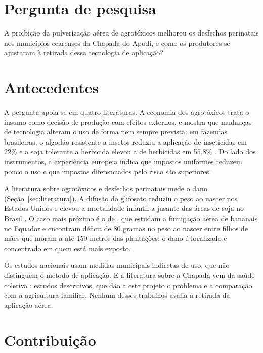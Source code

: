 \section{Pergunta de pesquisa}

A proibição da pulverização aérea de agrotóxicos melhorou os desfechos
perinatais nos municípios cearenses da Chapada do Apodi, e como os produtores
se ajustaram à retirada dessa tecnologia de aplicação?

\section{Antecedentes}

A pergunta apoia-se em quatro literaturas. A economia dos agrotóxicos trata o
insumo como decisão de produção com efeitos externos, e mostra que mudanças de
tecnologia alteram o uso de forma nem sempre prevista: em fazendas brasileiras, o algodão resistente a insetos reduziu a
aplicação de inseticidas em 22\% e a soja tolerante a herbicida elevou a de
herbicidas em 55,8\% \cite{seixas2022gm}. Do lado dos instrumentos, a
experiência europeia indica que impostos uniformes reduzem pouco o uso e que
impostos diferenciados pelo risco são superiores
\cite{bocker2016taxes,finger2017taxation}.

A literatura sobre agrotóxicos e desfechos perinatais mede o dano
(Seção~\ref{sec:literatura}). A difusão do glifosato reduziu o peso ao nascer
nos Estados Unidos \cite{reynier2025glyphosate} e elevou a mortalidade
infantil a jusante das áreas de soja no Brasil \cite{dias2023down}. O caso
mais próximo é o de , que estudam a fumigação
aérea de bananais no Equador e encontram déficit de 80 gramas no peso ao
nascer entre filhos de mães que moram a até 150 metros das plantações: o dano
é localizado e concentrado em quem está mais exposto.

Os estudos nacionais \cite{rodrigues2022tese,januzzi2025} usam medidas municipais indiretas de uso, que não distinguem o método de
aplicação. E a literatura sobre a Chapada vem da saúde coletiva
\cite{rigotto2013trends,aguiar2017}: estudos descritivos, que dão a este
projeto o problema e a comparação com a agricultura familiar.
Nenhum desses trabalhos avalia a retirada da aplicação aérea.

\section{Contribuição}

